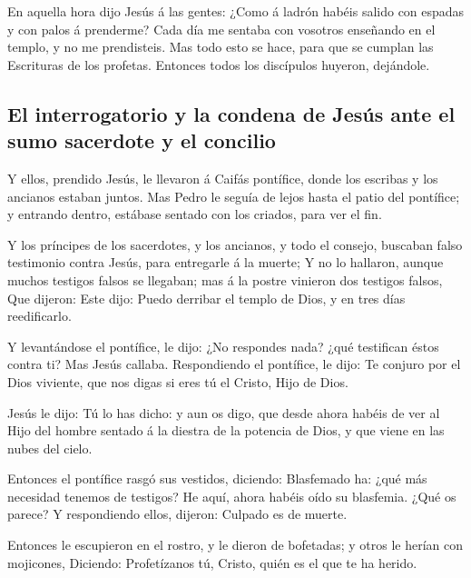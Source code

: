  En aquella hora dijo Jesús á las gentes: ¿Como á ladrón
habéis salido con espadas y con palos á prenderme? Cada día me sentaba
con vosotros enseñando en el templo, y no me prendisteis.
 Mas todo esto se hace, para que se cumplan las
Escrituras de los profetas. Entonces todos los discípulos huyeron,
dejándole.

\hypertarget{el-interrogatorio-y-la-condena-de-jesuxfas-ante-el-sumo-sacerdote-y-el-concilio}{%
\subsection{El interrogatorio y la condena de Jesús ante el sumo
sacerdote y el
concilio}\label{el-interrogatorio-y-la-condena-de-jesuxfas-ante-el-sumo-sacerdote-y-el-concilio}}

 Y ellos, prendido Jesús, le llevaron á Caifás pontífice,
donde los escribas y los ancianos estaban juntos.  Mas
Pedro le seguía de lejos hasta el patio del pontífice; y entrando
dentro, estábase sentado con los criados, para ver el fin.

 Y los príncipes de los sacerdotes, y los ancianos, y
todo el consejo, buscaban falso testimonio contra Jesús, para entregarle
á la muerte;  Y no lo hallaron, aunque muchos testigos
falsos se llegaban; mas á la postre vinieron dos testigos falsos,
 Que dijeron: Este dijo: Puedo derribar el templo de
Dios, y en tres días reedificarlo.

 Y levantándose el pontífice, le dijo: ¿No respondes
nada? ¿qué testifican éstos contra ti?  Mas Jesús
callaba. Respondiendo el pontífice, le dijo: Te conjuro por el Dios
viviente, que nos digas si eres tú el Cristo, Hijo de Dios.

 Jesús le dijo: Tú lo has dicho: y aun os digo, que desde
ahora habéis de ver al Hijo del hombre sentado á la diestra de la
potencia de Dios, y que viene en las nubes del cielo.

 Entonces el pontífice rasgó sus vestidos, diciendo:
Blasfemado ha: ¿qué más necesidad tenemos de testigos? He aquí, ahora
habéis oído su blasfemia.  ¿Qué os parece? Y respondiendo
ellos, dijeron: Culpado es de muerte.

 Entonces le escupieron en el rostro, y le dieron de
bofetadas; y otros le herían con mojicones,  Diciendo:
Profetízanos tú, Cristo, quién es el que te ha herido.

